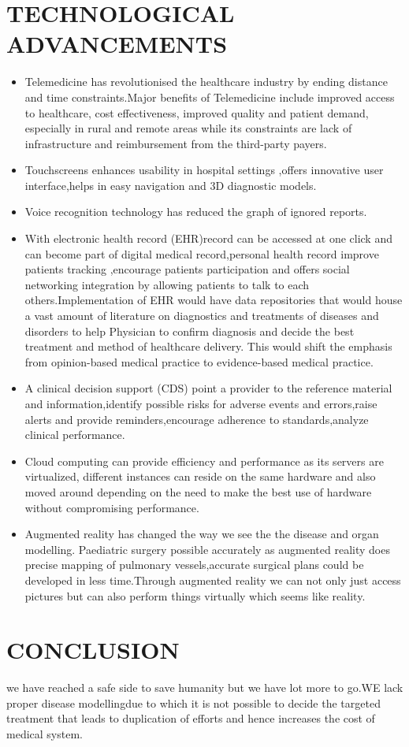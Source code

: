 \documentclass[12pt]{article}
\begin{document}
\section{TECHNOLOGICAL ADVANCEMENTS}
\begin{itemize} 
\item Telemedicine has revolutionised the healthcare industry by ending distance and time constraints.Major benefits of Telemedicine include improved access to healthcare, cost effectiveness, improved quality and patient demand, especially in rural and remote areas while its constraints are lack of infrastructure and reimbursement from the third-party payers.
\item 
Touchscreens enhances usability in hospital settings ,offers innovative user interface,helps in easy navigation and 3D diagnostic models.
\item 
Voice recognition technology has reduced the graph of ignored reports.
\item 
With electronic health record (EHR)record can be accessed at one click and can become part of digital medical record,personal health record improve patients tracking ,encourage patients participation and offers social networking integration by allowing patients to talk to each others.Implementation of EHR would have data repositories that would house a vast amount of literature on diagnostics and treatments of diseases and disorders to help Physician to confirm diagnosis and decide the best treatment and method of healthcare delivery. This would shift the emphasis from opinion-based medical practice to evidence-based medical practice.
\item 
A clinical decision support (CDS) point a provider to the reference material and information,identify possible risks for adverse events and errors,raise alerts and provide reminders,encourage adherence to standards,analyze clinical performance.
\item
Cloud computing can provide efficiency and performance as its servers are virtualized, different instances can reside on the same hardware and also moved around depending on the need to make the best use of hardware without compromising performance.
\item 
Augmented reality has changed the way we see the the disease and organ modelling. Paediatric surgery possible accurately as augmented reality does precise mapping of pulmonary vessels,accurate surgical plans could be developed in less time.Through augmented reality we can not only just access pictures but can also perform things virtually which seems like reality.
\end{itemize}
\section{CONCLUSION}
we have reached a safe side to save humanity but we have lot more to go.WE lack proper disease modellingdue to which it is not possible to decide the targeted treatment that leads to duplication of efforts and hence increases the cost of medical system.
 
\end{document}
